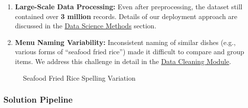 \documentclass[
  11pt,
  a4paper,
  DIV=11,
  numbers=noendperiod]{scrartcl}
\begin{document}
\begin{enumerate}
\def\labelenumi{\arabic{enumi}.}
\setcounter{enumi}{1}
\item
  \textbf{Large-Scale Data Processing:} Even after preprocessing, the
  dataset still contained over \textbf{3 million} records. Details of
  our deployment approach are discussed in the
  \hyperref[distributed-deployment]{Data Science Methods} section.
\item
  \textbf{Menu Naming Variability:} Inconsistent naming of similar
  dishes (e.g., various forms of ``seafood fried rice'') made it
  difficult to compare and group items. We address this challenge in
  detail in the \hyperref[data-cleaning-module]{Data Cleaning Module}.
\end{enumerate}

\begin{figure}

\caption{\label{fig-seafood-fried-rice-var}Seafood Fried Rice Spelling
Variation}


\end{figure}%

\newpage

\subsubsection{Solution Pipeline}\label{solution-pipeline}
\end{document}
